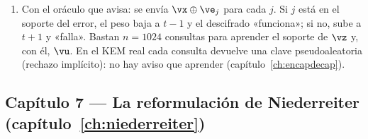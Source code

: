 \begin{enumerate}[leftmargin=1.9em,itemsep=4pt]
        estructurada (los códigos de Goppa); (b)~para $n=3488$ fijo
        no acota nada concreto; (c)~y la seguridad del esquema es una
        conjetura de dureza \emph{en media} sobre su distribución
        (capítulo~\ref{ch:seguridad}).
  \item Con el oráculo que avisa: se envía $\vx\oplus\ve_j$ para cada
        $j$. Si $j$ está en el soporte del error, el peso baja a
        $t-1$ y el descifrado «funciona»; si no, sube a $t+1$ y
        «falla». Bastan $n=1024$ consultas para aprender el soporte
        de $\vz$ y, con él, $\vu$. En el KEM real cada consulta
        devuelve una clave pseudoaleatoria (rechazo implícito): no
        hay aviso que aprender (capítulo~\ref{ch:encapdecap}).
\end{enumerate}

\subsection*{Capítulo 7 --- La reformulación de Niederreiter
(capítulo~\ref{ch:niederreiter})}

